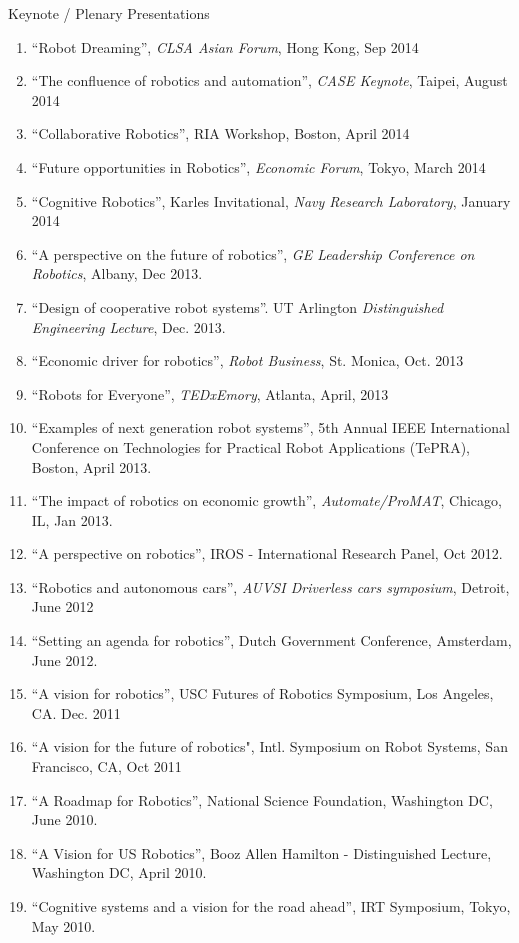 \documentclass{article}
\begin{document}
\begin{cv}
\begin{cvlist}{Keynote / Plenary Presentations}
\begin{enumerate}
  \item ``Robot Dreaming'', {\em CLSA Asian Forum}, Hong Kong, Sep 2014
  \item ``The confluence of robotics and automation'', {\em CASE Keynote}, Taipei, August 2014
  \item ``Collaborative Robotics'', RIA Workshop, Boston, April 2014
  \item ``Future opportunities in Robotics'', {\em Economic Forum}, Tokyo, March 2014
  \item ``Cognitive Robotics'', Karles Invitational, {\em Navy Research Laboratory}, January 2014
  \item ``A perspective on the future of robotics'', {\em GE Leadership Conference on Robotics}, Albany, Dec 2013.
  \item ``Design of cooperative robot systems''. UT Arlington {\em Distinguished Engineering Lecture}, Dec. 2013.
  \item ``Economic driver for robotics'', {\em Robot Business}, St. Monica,  Oct. 2013
  \item ``Robots for Everyone'', {\em TEDxEmory}, Atlanta, April, 2013
  \item ``Examples of next generation robot systems'', 5th Annual IEEE
    International Conference on Technologies for Practical Robot
    Applications (TePRA), Boston, April 2013.
  \item ``The impact of robotics on economic growth'', {\em Automate/ProMAT}, Chicago, IL, Jan 2013.
  \item ``A perspective on robotics'', IROS - International Research  Panel, Oct 2012.
  \item ``Robotics and autonomous cars'', {\em AUVSI Driverless cars symposium}, Detroit, June 2012
  \item ``Setting an agenda for robotics'', Dutch Government  Conference, Amsterdam, June 2012.
  \item ``A vision for robotics'', USC Futures of Robotics Symposium, Los Angeles, CA.  Dec. 2011
  \item ``A vision for the future of robotics", Intl. Symposium on Robot Systems, San Francisco, CA, Oct 2011
  \item ``A Roadmap for Robotics'', National Science Foundation,  Washington DC, June 2010.
  \item ``A Vision for US Robotics'', Booz Allen Hamilton -  Distinguished Lecture, Washington DC, April 2010.
  \item ``Cognitive systems and a vision for the road ahead'', IRT  Symposium, Tokyo, May 2010.

\end{enumerate}
\end{cvlist}
\end{cv}
\end{document}
